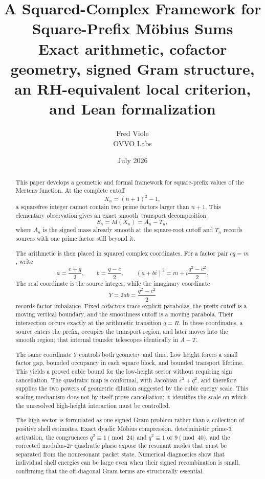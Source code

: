 \documentclass[11pt]{article}
\title{\textbf{A Squared-Complex Framework for Square-Prefix M\"obius Sums}\\[0.5em]
\large Exact arithmetic, cofactor geometry, signed Gram structure,\\
an RH-equivalent local criterion, and Lean formalization}
\author{Fred Viole\\OVVO Labs}
\date{July 2026}
\theoremstyle{definition}
\theoremstyle{remark}
\newcommand{\1}{\mathbf{1}}
\begin{document}
\pagestyle{fancy}
\fancyhf{}
\fancyfoot[C]{\thepage}
\maketitle

\begin{abstract}
This paper develops a geometric and formal framework for square-prefix values of the Mertens function.  At the complete cutoff
\[
 X_n=(n+1)^2-1,
\]
a squarefree integer cannot contain two prime factors larger than $n+1$.  This elementary observation gives an exact smooth--transport decomposition
\[
 S_n=M(X_n)=A_n-T_n,
\]
where $A_n$ is the signed mass already smooth at the square-root cutoff and $T_n$ records sources with one prime factor still beyond it.

The arithmetic is then placed in squared complex coordinates.  For a factor pair $cq=m$, write
\[
 a=\frac{c+q}{2},\qquad b=\frac{q-c}{2},\qquad
 (a+bi)^2=m+i\frac{q^2-c^2}{2}.
\]
The real coordinate is the source integer, while the imaginary coordinate
\[
 Y=2ab=\frac{q^2-c^2}{2}
\]
records factor imbalance.  Fixed cofactors trace explicit parabolas, the prefix cutoff is a moving vertical boundary, and the smoothness cutoff is a moving parabola.  Their intersection occurs exactly at the arithmetic transition $q=R$.  In these coordinates, a source enters the prefix, occupies the transport region, and later moves into the smooth region; that internal transfer telescopes identically in $A-T$.

The same coordinate $Y$ controls both geometry and time.  Low height forces a small factor gap, bounded occupancy in each square block, and bounded transport lifetime.  This yields a proved cubic bound for the low-height sector without requiring sign cancellation.  The quadratic map is conformal, with Jacobian $c^2+q^2$, and therefore supplies the two powers of geometric dilution suggested by the cubic energy scale.  This scaling mechanism does not by itself prove cancellation; it identifies the scale on which the unresolved high-height interaction must be controlled.

The high sector is formulated as one signed Gram problem rather than a collection of positive shell estimates.  Exact dyadic M\"obius compression, deterministic prime-$3$ activation, the congruences $q^2\equiv1\pmod{24}$ and $q^2\equiv1$ or $9\pmod{40}$, and the corrected modulus-$2r$ quadratic phase expose the resonant modes that must be separated from the nonresonant packet state.  Numerical diagnostics show that individual shell energies can be large even when their signed recombination is small, confirming that the off-diagonal Gram terms are structurally essential.


\end{abstract}
\end{document}

